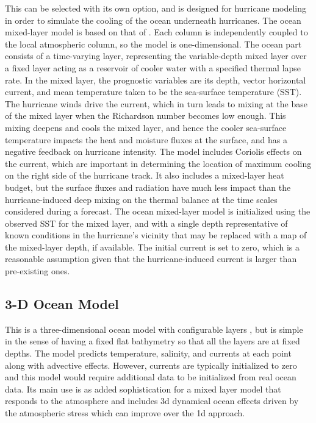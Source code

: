 This can be selected with its own option, and is designed for
hurricane modeling in order to simulate the cooling of the ocean underneath
hurricanes. The ocean mixed-layer model is based on that of \citet{pollard73}. Each column is independently coupled to the local atmospheric column, so the model is one-dimensional. The ocean part consists of a time-varying layer, representing the variable-depth mixed layer over a fixed layer acting as a reservoir of cooler water with a specified thermal lapse rate. In the mixed layer, the prognostic variables are its depth, vector horizontal current, and mean temperature taken to be the sea-surface temperature (SST). The hurricane winds drive the current, which in turn leads to mixing at the base of the mixed layer when the Richardson number becomes low enough. This mixing deepens and cools the mixed layer, and hence the cooler sea-surface temperature impacts the heat and moisture fluxes at the surface, and has a negative feedback on hurricane intensity. The model includes Coriolis effects on the current, which are important in determining the location of maximum cooling on the right side of the hurricane track. It also includes a mixed-layer heat budget, but the surface fluxes and radiation have much less impact than the hurricane-induced deep mixing on the thermal balance at the time scales considered during a forecast. The ocean mixed-layer model is initialized using the observed SST for the mixed layer, and with a single depth representative of known conditions in the hurricane's vicinity that may be replaced with a map of the mixed-layer depth, if available. The initial current is set to zero, which is a reasonable assumption given that the hurricane-induced current is larger than pre-existing ones.

\subsection{3-D Ocean Model}

This is a three-dimensional ocean model with configurable layers \citep{price94,lee12}, but is simple in the sense of having a fixed flat bathymetry so that all the layers are at fixed depths.
The model predicts temperature, salinity, and currents at each point along with advective effects. However, currents are typically initialized to zero and this model would
require additional data to be initialized from real ocean data. Its main use is as added sophistication for a mixed layer model that responds to the atmosphere and includes
3d dynamical ocean effects driven by the atmospheric stress which can improve over the 1d approach.

